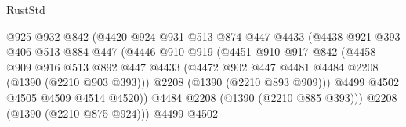 \begin{lexlean}{RustStd}
\begin{coremodule}
                                    @925
                                    @932
                                    @842
                                    (@4420
                                      @924
                                      @931
                                      @513
                                      @874
                                      @447
                                      @4433
                                      (@4438
                                        @921
                                        @393
                                        @406
                                        @513
                                        @884
                                        @447
                                        (@4446
                                          @910
                                          @919
                                          (@4451
                                            @910
                                            @917
                                            @842
                                            (@4458
                                              @909
                                              @916
                                              @513
                                              @892
                                              @447
                                              @4433
                                              (@4472
                                                @902
                                                @447
                                                @4481
                                                @4484
                                                @2208
                                                (@1390 (@2210 @903 @393)))
                                              @2208
                                              (@1390 (@2210 @893 @909)))
                                            @4499
                                            @4502
                                            @4505
                                            @4509
                                            @4514
                                            @4520))
                                        @4484
                                        @2208
                                        (@1390 (@2210 @885 @393)))
                                      @2208
                                      (@1390 (@2210 @875 @924)))
                                    @4499
                                    @4502

\end{coremodule}
\end{lexlean}
